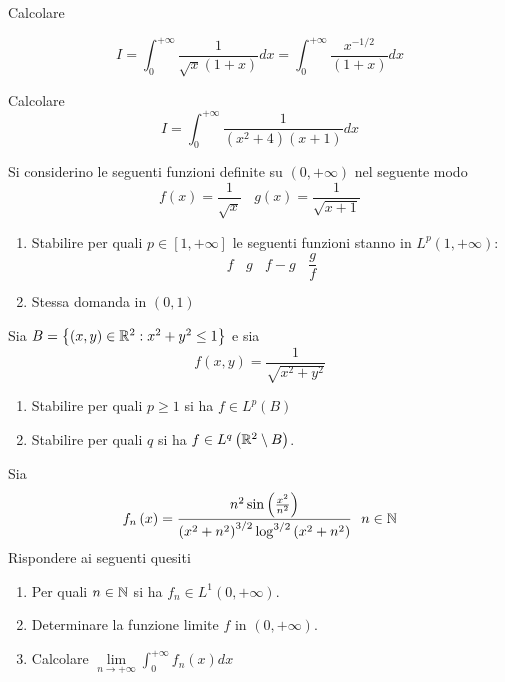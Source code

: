Calcolare


\begin{equation*}
I = \int^{+ \infty}_{0}\frac{1}{\sqrt{x}\left(1 + x\right)} dx = \int^{+ \infty}_{0}\frac{x^{- 1/2}}{\left(1 + x\right)} dx
\end{equation*}
\Esercizio{}

Calcolare
\begin{equation*}
I = \int^{+ \infty}_{0}\frac{1}{\left(x^{2} + 4\right)\left(x + 1\right)} dx
\end{equation*}

Si considerino le seguenti funzioni definite su $\left(0, + \infty \right)$ nel seguente modo
\begin{equation*}
f\left(x\right) = \frac{1}{\sqrt{x}} \ \ \ \ g\left(x\right) = \frac{1}{\sqrt{x + 1}}
\end{equation*}
\begin{enumerate}
\item Stabilire per quali $p\in \left[ 1, + \infty \right]$ le seguenti funzioni stanno in $L^{p}\left(1, + \infty \right)$:
\begin{equation*}
f\ \ \ \ g\ \ \ \ f - g\ \ \ \ \frac{g}{f}
\end{equation*}
\item Stessa domanda in $\left(0, 1\right)$
\end{enumerate}
\Esercizio{}

Sia $B = \left\{\left(x, y\right) \in \mathbb{R}^{2} :x^{2} + y^{2} \leq 1\right\}$ e sia
\begin{equation*}
f\left(x, y\right) = \frac{1}{\sqrt{x^{2} + y^{2}}}
\end{equation*}
\begin{enumerate}
\item Stabilire per quali $p \geq 1$ si ha $f\in L^{p}\left(B\right)$
\item Stabilire per quali $q$ si ha $f\in L^{q}\left(\mathbb{R}^{2} \setminus B\right)$.
\end{enumerate}
\Esercizio{}

Sia
\begin{equation*}
f_{n}\left(x\right) = \frac{n^{2}\sin\left(\frac{x^{2}}{n^{2}}\right)}{\left(x^{2} + n^{2}\right)^{3/2}\log^{3/2}\left(x^{2} + n^{2}\right)} \ \ n\in \mathbb{N} 
\end{equation*}
Rispondere ai seguenti quesiti
\begin{enumerate}
\item Per quali $n\in \mathbb{N} $ si ha $f_{n} \in L^{1}\left(0, + \infty \right)$.
\item Determinare la funzione limite $f$ in $\left(0, + \infty \right)$.
\item Calcolare $\lim\limits_{n\rightarrow + \infty}\int^{+ \infty}_{0} f_{n}\left(x\right) dx$
\end{enumerate}
\Esercizio{}

